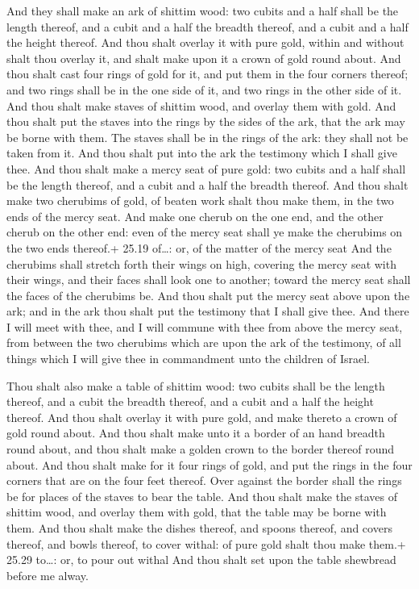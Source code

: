  And they shall make an ark of shittim wood: two cubits
and a half shall be the length thereof, and a cubit and a half the
breadth thereof, and a cubit and a half the height thereof.
 And thou shalt overlay it with pure gold, within and
without shalt thou overlay it, and shalt make upon it a crown of gold
round about.  And thou shalt cast four rings of gold for
it, and put them in the four corners thereof; and two rings shall be in
the one side of it, and two rings in the other side of it. 
And thou shalt make staves of shittim wood, and overlay them with gold.
 And thou shalt put the staves into the rings by the sides
of the ark, that the ark may be borne with them.  The
staves shall be in the rings of the ark: they shall not be taken from
it.  And thou shalt put into the ark the testimony which I
shall give thee.  And thou shalt make a mercy seat of pure
gold: two cubits and a half shall be the length thereof, and a cubit and
a half the breadth thereof.  And thou shalt make two
cherubims of gold, of beaten work shalt thou make them, in the two ends
of the mercy seat.  And make one cherub on the one end, and
the other cherub on the other end: even of the mercy seat shall ye make
the cherubims on the two ends thereof.+ 25.19 of\ldots: or, of the
matter of the mercy seat  And the cherubims shall stretch
forth their wings on high, covering the mercy seat with their wings, and
their faces shall look one to another; toward the mercy seat shall the
faces of the cherubims be.  And thou shalt put the mercy
seat above upon the ark; and in the ark thou shalt put the testimony
that I shall give thee.  And there I will meet with thee,
and I will commune with thee from above the mercy seat, from between the
two cherubims which are upon the ark of the testimony, of all things
which I will give thee in commandment unto the children of Israel.

 Thou shalt also make a table of shittim wood: two cubits
shall be the length thereof, and a cubit the breadth thereof, and a
cubit and a half the height thereof.  And thou shalt
overlay it with pure gold, and make thereto a crown of gold round about.
 And thou shalt make unto it a border of an hand breadth
round about, and thou shalt make a golden crown to the border thereof
round about.  And thou shalt make for it four rings of
gold, and put the rings in the four corners that are on the four feet
thereof.  Over against the border shall the rings be for
places of the staves to bear the table.  And thou shalt
make the staves of shittim wood, and overlay them with gold, that the
table may be borne with them.  And thou shalt make the
dishes thereof, and spoons thereof, and covers thereof, and bowls
thereof, to cover withal: of pure gold shalt thou make them.+ 25.29
to\ldots: or, to pour out withal  And thou shalt set upon
the table shewbread before me alway.


